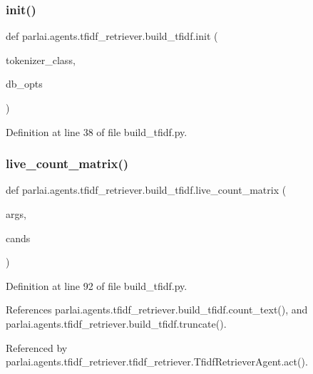 \subsubsection{\texorpdfstring{init()}{init()}}
{\footnotesize\ttfamily def parlai.\+agents.\+tfidf\+\_\+retriever.\+build\+\_\+tfidf.\+init (\begin{DoxyParamCaption}\item[{}]{tokenizer\+\_\+class,  }\item[{}]{db\+\_\+opts }\end{DoxyParamCaption})}



Definition at line 38 of file build\+\_\+tfidf.\+py.

\mbox{\label{namespaceparlai_1_1agents_1_1tfidf__retriever_1_1build__tfidf_af51dc8629608fd04435739ba76b1e8f2}} 
\subsubsection{\texorpdfstring{live\+\_\+count\+\_\+matrix()}{live\_count\_matrix()}}
{\footnotesize\ttfamily def parlai.\+agents.\+tfidf\+\_\+retriever.\+build\+\_\+tfidf.\+live\+\_\+count\+\_\+matrix (\begin{DoxyParamCaption}\item[{}]{args,  }\item[{}]{cands }\end{DoxyParamCaption})}



Definition at line 92 of file build\+\_\+tfidf.\+py.



References parlai.\+agents.\+tfidf\+\_\+retriever.\+build\+\_\+tfidf.\+count\+\_\+text(), and parlai.\+agents.\+tfidf\+\_\+retriever.\+build\+\_\+tfidf.\+truncate().



Referenced by parlai.\+agents.\+tfidf\+\_\+retriever.\+tfidf\+\_\+retriever.\+Tfidf\+Retriever\+Agent.\+act().

